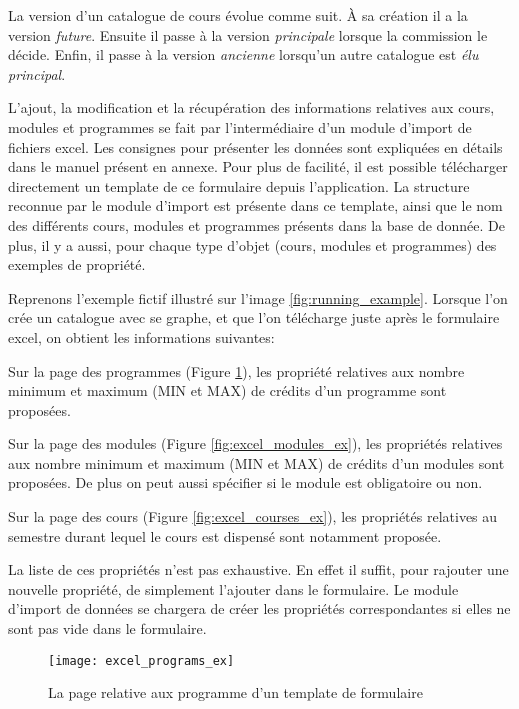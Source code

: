 La version d'un catalogue de cours évolue comme suit. À sa création il a la version \textit{future}. Ensuite il passe à la version \textit{principale} lorsque la commission le décide. Enfin, il passe à la version \textit{ancienne} lorsqu'un autre catalogue est \textit{élu} \textit{principal}. 

L'ajout, la modification et la récupération des informations relatives aux cours, modules et programmes se fait par l'intermédiaire d'un module d'import de fichiers excel. Les consignes pour présenter les données sont expliquées en détails dans le manuel présent en annexe. Pour plus de facilité, il est possible télécharger directement un template de ce formulaire depuis l'application. La structure reconnue par le module d'import est présente dans ce template, ainsi que le nom des différents cours, modules et programmes présents dans la base de donnée. De plus, il y a aussi, pour chaque type d'objet (cours, modules et programmes) des exemples de propriété. 

Reprenons l'exemple fictif illustré sur l'image \ref{fig:running_example}. Lorsque l'on crée un catalogue avec se graphe, et que l'on télécharge juste après le formulaire excel, on obtient les informations suivantes:

Sur la page des programmes (Figure \ref{fig:excel_programs_ex}), les propriété relatives aux nombre minimum et maximum (MIN et MAX) de crédits d'un programme sont proposées.

Sur la page des modules (Figure \ref{fig:excel_modules_ex}), les propriétés relatives aux nombre minimum et maximum (MIN et MAX) de crédits d'un modules sont proposées. De plus on peut aussi spécifier si le module est obligatoire ou non.

Sur la page des cours (Figure \ref{fig:excel_courses_ex}), les propriétés relatives au semestre durant lequel le cours est dispensé sont notamment proposée. 

La liste de ces propriétés n'est pas exhaustive. En effet il suffit, pour rajouter une nouvelle propriété, de simplement l'ajouter dans le formulaire. Le module d'import de données se chargera de créer les propriétés correspondantes si elles ne sont pas vide dans le formulaire. 

\begin{figure}
\centering
\caption{La page relative aux programme d'un template de formulaire}
\label{fig:excel_programs_ex}
\texttt{[image: excel\_programs\_ex]}
\end{figure}

